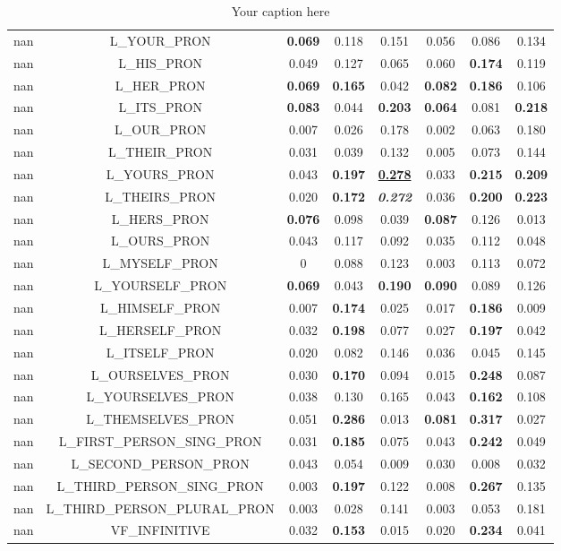 \begin{table}[ht]
\begin{tabular}{lccccccc}
nan & L_YOUR_PRON & \textbf{0.069} & 0.118 & 0.151 & 0.056 & 0.086 & 0.134 \\
nan & L_HIS_PRON & 0.049 & 0.127 & 0.065 & 0.060 & \textbf{0.174} & 0.119 \\
nan & L_HER_PRON & \textbf{0.069} & \textbf{0.165} & 0.042 & \textbf{0.082} & \textbf{0.186} & 0.106 \\
nan & L_ITS_PRON & \textbf{0.083} & 0.044 & \textbf{0.203} & \textbf{0.064} & 0.081 & \textbf{0.218} \\
nan & L_OUR_PRON & 0.007 & 0.026 & 0.178 & 0.002 & 0.063 & 0.180 \\
nan & L_THEIR_PRON & 0.031 & 0.039 & 0.132 & 0.005 & 0.073 & 0.144 \\
nan & L_YOURS_PRON & 0.043 & \textbf{0.197} & \textbf{\underline{\textbf{0.278}}} & 0.033 & \textbf{0.215} & \textbf{0.209} \\
nan & L_THEIRS_PRON & 0.020 & \textbf{0.172} & \textit{\textbf{0.272}} & 0.036 & \textbf{0.200} & \textbf{0.223} \\
nan & L_HERS_PRON & \textbf{0.076} & 0.098 & 0.039 & \textbf{0.087} & 0.126 & 0.013 \\
nan & L_OURS_PRON & 0.043 & 0.117 & 0.092 & 0.035 & 0.112 & 0.048 \\
nan & L_MYSELF_PRON & 0 & 0.088 & 0.123 & 0.003 & 0.113 & 0.072 \\
nan & L_YOURSELF_PRON & \textbf{0.069} & 0.043 & \textbf{0.190} & \textbf{0.090} & 0.089 & 0.126 \\
nan & L_HIMSELF_PRON & 0.007 & \textbf{0.174} & 0.025 & 0.017 & \textbf{0.186} & 0.009 \\
nan & L_HERSELF_PRON & 0.032 & \textbf{0.198} & 0.077 & 0.027 & \textbf{0.197} & 0.042 \\
nan & L_ITSELF_PRON & 0.020 & 0.082 & 0.146 & 0.036 & 0.045 & 0.145 \\
nan & L_OURSELVES_PRON & 0.030 & \textbf{0.170} & 0.094 & 0.015 & \textbf{0.248} & 0.087 \\
nan & L_YOURSELVES_PRON & 0.038 & 0.130 & 0.165 & 0.043 & \textbf{0.162} & 0.108 \\
nan & L_THEMSELVES_PRON & 0.051 & \textbf{0.286} & 0.013 & \textbf{0.081} & \textbf{0.317} & 0.027 \\
nan & L_FIRST_PERSON_SING_PRON & 0.031 & \textbf{0.185} & 0.075 & 0.043 & \textbf{0.242} & 0.049 \\
nan & L_SECOND_PERSON_PRON & 0.043 & 0.054 & 0.009 & 0.030 & 0.008 & 0.032 \\
nan & L_THIRD_PERSON_SING_PRON & 0.003 & \textbf{0.197} & 0.122 & 0.008 & \textbf{0.267} & 0.135 \\
nan & L_THIRD_PERSON_PLURAL_PRON & 0.003 & 0.028 & 0.141 & 0.003 & 0.053 & 0.181 \\
nan & VF_INFINITIVE & 0.032 & \textbf{0.153} & 0.015 & 0.020 & \textbf{0.234} & 0.041 \\
\bottomrule
\end{tabular}
\caption{Your caption here}
\label{tab:your_label}
\end{table}